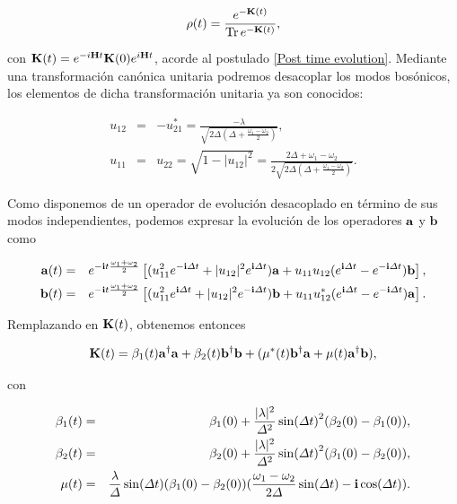 \documentclass{report} %
\numberwithin{equation}{section}
\begin{document}
\begin{equation}
    \rho(t) = \frac{e^{-{\bf K}(t)}}{\Tr e^{-{\bf K}(t)}},
\end{equation}

con ${\bf K} (t) = e^{-i{\bf H}t} {\bf K}(0)e^{i{\bf H}t}$, acorde al postulado \ref{Post time evolution}. Mediante una transformación canónica unitaria podremos desacoplar los modos bosónicos, los elementos de dicha transformación unitaria ya son conocidos:

\begin{eqnarray*}
  u_{12}&=&-u_{21}^*= \frac{-\lambda}{\sqrt{2 \Delta (\Delta +\frac{\omega_1-\omega_2}{2})}},\\
  u_{11}&=&u_{22}=\sqrt{1-|u_{12}|^2}=\frac{2\Delta+\omega_1-\omega_2}{2\sqrt{2 \Delta  (\Delta  +\frac{\omega_1-\omega_2}{2})}}.
\end{eqnarray*}

Como disponemos de un operador de evolución desacoplado en término de sus modos independientes, podemos expresar la evolución de los operadores ${\bf a}$ y ${\mathbf b}$ como

\begin{eqnarray*}
  {\bf a}(t)&=& e^{-{\bf i}t\frac{\omega_1+\omega_2}{2}}\left[(u_{11}^2e^{-{\bf i}\Delta t}+|u_{12}|^2e^{{\bf i}\Delta t}){\bf a}+
                u_{11}u_{12}(e^{{\bf i}\Delta t}-e^{-{\bf i}\Delta t}){\mathbf b}\right],\\
  {\mathbf b}(t)&=& e^{-{\bf i}t\frac{\omega_1+\omega_2}{2}}\left[(u_{11}^2e^{{\bf i}\Delta t}+|u_{12}|^2e^{-{\bf i}\Delta t}){\mathbf b}+
                u_{11}u^*_{12}(e^{{\bf i}\Delta t}-e^{-{\bf i}\Delta t}){\bf a}\right].\\
\end{eqnarray*}

Remplazando en ${\bf K}(t)$, obtenemos entonces

\begin{equation}
{\bf K}(t)=\beta_1(t) {\bf a}^\dag{\bf a} + \beta_2(t) {\mathbf b}^\dag{\mathbf b} +  (\mu^*(t){\mathbf b}^\dag{\bf a}+\mu(t){\bf a}^\dag{\mathbf b}),
\end{equation}

con

\begin{eqnarray}
  \beta_1(t)&=&\beta_1(0) + \frac{|\lambda|^2}{\Delta^2}
                \sin(\Delta t)^2 (\beta_2(0) -\beta_1(0) ),  \\
  \beta_2(t)&=& \beta_2(0)
                + \frac{|\lambda|^2}{\Delta^2}
                \sin(\Delta t)^2 (\beta_1(0) -\beta_2(0) ), \\
  \mu(t)  &=& \frac{\lambda}{\Delta}\sin(\Delta t)
              (\beta_1(0)-\beta_2(0))( \frac{\omega_1-\omega_2}{2\Delta }\sin(\Delta t)  -{\bf i}\cos(\Delta t)).
\end{eqnarray}
\end{document}
